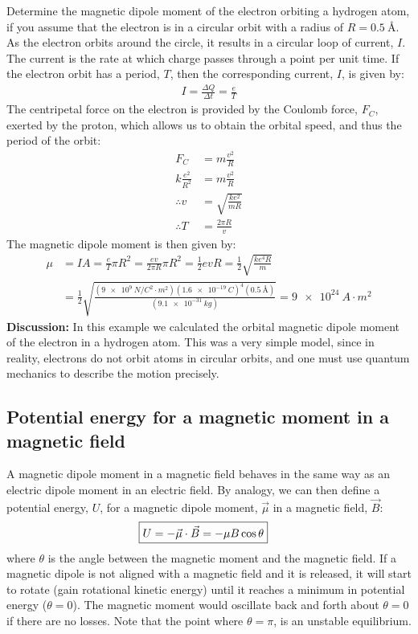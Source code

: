 \begin{example}{Determine the magnetic dipole moment of the electron orbiting a hydrogen atom, if you assume that the electron is in a circular orbit with a radius of $R=\SI{0.5}{\angstrom}$.}
As the electron orbits around the circle, it results in a circular loop of current, $I$. The current is the rate at which charge passes through a point per unit time. If the electron orbit has a period, $T$, then the corresponding current, $I$, is given by:
\begin{align*}
I=\frac{\Delta Q}{\Delta t} = \frac{e}{T}
\end{align*}
The centripetal force on the electron is provided by the Coulomb force, $F_C$, exerted by the proton, which allows us to obtain the orbital speed, and thus the period of the orbit:
\begin{align*}
F_C &= m\frac{v^2}{R}\\
k\frac{e^2}{R^2}&= m\frac{v^2}{R}\\
\therefore v &=\sqrt{\frac{ke^2}{mR}}\\
\therefore T &= \frac{2\pi R}{v}
\end{align*}
The magnetic dipole moment is then given by:
\begin{align*}
\mu &= IA = \frac{e}{T} \pi R^2 = \frac{ev}{2\pi R} \pi R^2=\frac{1}{2} evR=\frac{1}{2} \sqrt{\frac{ke^4R}{m}}\\
&=\frac{1}{2} \sqrt{\frac{(\SI{9e9}{N/C^{2}\cdot m^2})(\SI{1.6e-19}{C})^4(\SI{0.5}{\angstrom})}{(\SI{9.1e-31}{kg})}}=\SI{9e24}{A\cdot m^2}
\end{align*}
\textbf{Discussion:} In this example we calculated the orbital magnetic dipole moment of the electron in a hydrogen atom. This was a very simple model, since in reality, electrons do not orbit atoms in circular orbits, and one must use quantum mechanics to describe the motion precisely. 
\end{example}

\subsection{Potential energy for a magnetic moment in a magnetic field}
A magnetic dipole moment in a magnetic field behaves in the same way as an electric dipole moment in an electric field. By analogy, we can then define a potential energy, $U$, for a magnetic dipole moment, $\vec \mu$ in a magnetic field, $\vec B$:
\begin{align*}
\Aboxed{U =-\vec \mu \cdot \vec B =- \mu B \cos\theta}
\end{align*}
where $\theta$ is the angle between the magnetic moment and the magnetic field. If a magnetic dipole is not aligned with a magnetic field and it is released, it will start to rotate (gain rotational kinetic energy) until it reaches a minimum in potential energy ($\theta = 0$). The magnetic moment would oscillate back and forth about $\theta =0$ if there are no losses. Note that the point where $\theta = \pi$, is an unstable equilibrium.

